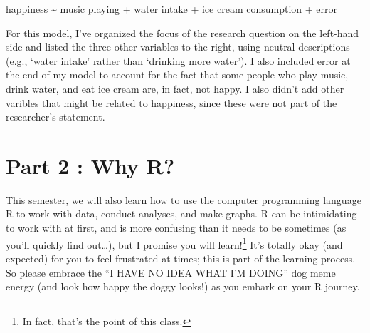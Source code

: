 \documentclass[
  letterpaper,
  DIV=11,
  numbers=noendperiod,
  oneside]{scrreprt}
\begin{document}
\begin{tcolorbox}[enhanced jigsaw, toptitle=1mm, toprule=.15mm, rightrule=.15mm, breakable, left=2mm, colbacktitle=quarto-callout-caution-color!10!white, colback=white, opacityback=0, coltitle=black, bottomtitle=1mm, opacitybacktitle=0.6, titlerule=0mm, leftrule=.75mm, arc=.35mm, bottomrule=.15mm, title=\textcolor{quarto-callout-caution-color}{\faFire}\hspace{0.5em}{Click Here to See The Answer}, colframe=quarto-callout-caution-color-frame]

happiness \textasciitilde{} music playing + water intake + ice cream
consumption + error

For this model, I've organized the focus of the research question on the
left-hand side and listed the three other variables to the right, using
neutral descriptions (e.g., `water intake' rather than `drinking more
water'). I also included error at the end of my model to account for the
fact that some people who play music, drink water, and eat ice cream
are, in fact, not happy. I also didn't add other varibles that might be
related to happiness, since these were not part of the researcher's
statement.

\end{tcolorbox}

\section{Part 2 : Why R?}\label{part-2-why-r}

This semester, we will also learn how to use the computer programming
language R to work with data, conduct analyses, and make graphs. R can
be intimidating to work with at first, and is more confusing than it
needs to be sometimes (as you'll quickly find out\ldots), but I promise
you will learn!\footnote{In fact, that's the point of this class.} It's
totally okay (and expected) for you to feel frustrated at times; this is
part of the learning process. So please embrace the ``I HAVE NO IDEA
WHAT I'M DOING'' dog meme energy (and look how happy the doggy looks!)
as you embark on your R journey.\\
\end{document}
